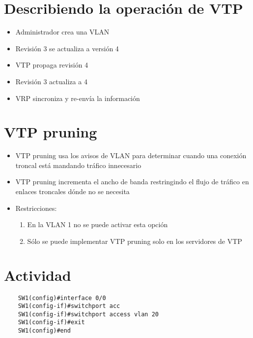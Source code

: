 \section{Describiendo la operación de VTP}
\begin{itemize}
    \item {Administrador crea una VLAN}
    \item {Revisión 3 se actualiza a versión 4}
    \item {VTP propaga revisión 4}
    \item {Revisión 3 actualiza a 4}
    \item {VRP sincroniza y re-envía la información}
\end{itemize}

\section{VTP pruning}

\begin{itemize}
    \item VTP pruning usa los avisos de VLAN para determinar cuando una conexión troncal está mandando tráfico innecesario 
    \item VTP pruning incrementa el ancho de banda restringindo el flujo de tráfico en enlaces troncales dónde no se necesita
    \item {Restricciones:
        \begin{enumerate}
            \item En la VLAN 1 no se puede activar esta opción 
            \item Sólo se puede implementar VTP pruning solo en los servidores de VTP
        \end{enumerate}}
\end{itemize}


\section{Actividad}

\begin{lstlisting}
    SW1(config)#interface 0/0
    SW1(config-if)#switchport acc
    SW1(config-if)#switchport access vlan 20
    SW1(config-if)#exit
    SW1(config)#end
\end{lstlisting}


